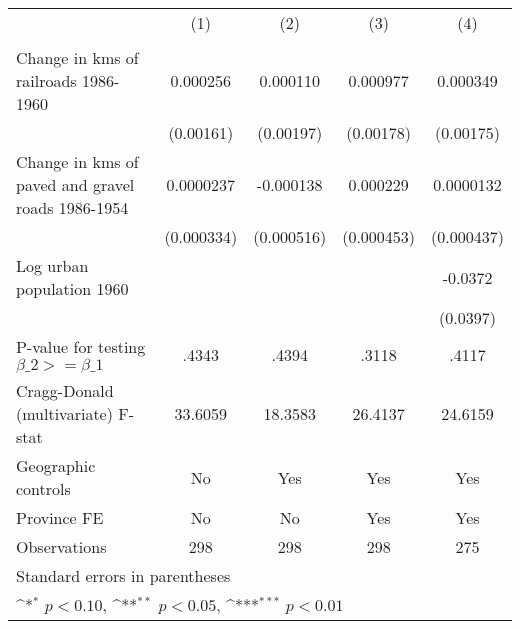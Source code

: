 {
\def\sym#1{\ifmmode^{#1}\else\(^{#1}\)\fi}
\begin{tabular}{l*{4}{c}}
\hline\hline
                &\multicolumn{1}{c}{(1)}&\multicolumn{1}{c}{(2)}&\multicolumn{1}{c}{(3)}&\multicolumn{1}{c}{(4)}\\
                &\multicolumn{1}{c}{}&\multicolumn{1}{c}{}&\multicolumn{1}{c}{}&\multicolumn{1}{c}{}\\
\hline
Change in kms of railroads 1986-1960& 0.000256         & 0.000110         & 0.000977         & 0.000349         \\
                &(0.00161)         &(0.00197)         &(0.00178)         &(0.00175)         \\
[1em]
Change in kms of paved and gravel roads 1986-1954&0.0000237         &-0.000138         & 0.000229         &0.0000132         \\
                &(0.000334)         &(0.000516)         &(0.000453)         &(0.000437)         \\
[1em]
Log urban population 1960&                  &                  &                  &  -0.0372         \\
                &                  &                  &                  & (0.0397)         \\
\hline
P-value for testing $\beta\_{2} >= \beta\_{1}$&    .4343         &    .4394         &    .3118         &    .4117         \\
Cragg-Donald (multivariate) F-stat&  33.6059         &  18.3583         &  26.4137         &  24.6159         \\
Geographic controls&       No         &      Yes         &      Yes         &      Yes         \\
Province FE     &       No         &       No         &      Yes         &      Yes         \\
Observations    &      298         &      298         &      298         &      275         \\
\hline\hline
\multicolumn{5}{l}{\footnotesize Standard errors in parentheses}\\
\multicolumn{5}{l}{\footnotesize \sym{*} \(p<0.10\), \sym{**} \(p<0.05\), \sym{***} \(p<0.01\)}\\
\end{tabular}
}
